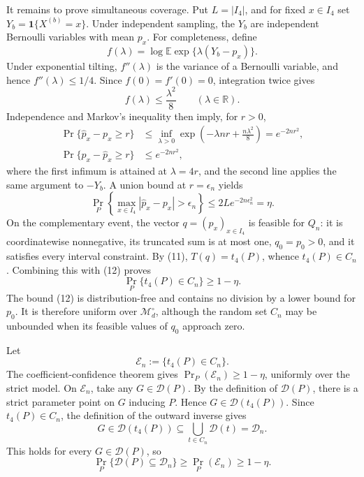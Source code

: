 It remains to prove simultaneous coverage.  Put \(L=|I_4|\), and for fixed \(x\in I_4\) set \(Y_b=\mathbf 1\{X^{(b)}=x\}\).  Under independent sampling, the \(Y_b\) are independent Bernoulli variables with mean \(p_x\).  For completeness, define
\[
 f(\lambda)=\log\mathbb E\exp\{\lambda(Y_b-p_x)\}.
\]
Under exponential tilting, \(f''(\lambda)\) is the variance of a Bernoulli variable, and hence \(f''(\lambda)\le1/4\).  Since \(f(0)=f'(0)=0\), integration twice gives
\[
 f(\lambda)\le\frac{\lambda^2}{8}\qquad(\lambda\in\mathbb R).
\]
Independence and Markov's inequality then imply, for \(r>0\),
\[
\begin{aligned}
 \Pr\{\widehat p_x-p_x\ge r\}
 &\le\inf_{\lambda>0}
   \exp\left(-\lambda nr+\frac{n\lambda^2}{8}\right)
 =e^{-2nr^2},\\
 \Pr\{p_x-\widehat p_x\ge r\}&\le e^{-2nr^2},
\end{aligned}
\]
where the first infimum is attained at \(\lambda=4r\), and the second line applies the same argument to \(-Y_b\).  A union bound at \(r=\epsilon_n\) yields
\[
 \Pr_P\!\left\{
   \max_{x\in I_4}|\widehat p_x-p_x|>\epsilon_n
 \right\}
 \le 2L e^{-2n\epsilon_n^2}=\eta.
\tag{12}
\]
On the complementary event, the vector \(q=(p_x)_{x\in I_4}\) is feasible for \(Q_n\): it is coordinatewise nonnegative, its truncated sum is at most one, \(q_0=p_0>0\), and it satisfies every interval constraint.  By (11), \(T(q)=t_4(P)\), whence \(t_4(P)\in C_n\).  Combining this with (12) proves
\[
 \Pr_P\{t_4(P)\in C_n\}\ge1-\eta.
\]
The bound (12) is distribution-free and contains no division by a lower bound for \(p_0\).  It is therefore uniform over \(\mathcal M_d^\circ\), although the random set \(C_n\) may be unbounded when its feasible values of \(q_0\) approach zero.

Let
\[
 \mathcal E_n:=\{t_4(P)\in C_n\}.
\]
The coefficient-confidence theorem gives \(\Pr_P(\mathcal E_n)\ge1-\eta\), uniformly over the strict model.  On \(\mathcal E_n\), take any \(G\in\mathcal D(P)\).  By the definition of \(\mathcal D(P)\), there is a strict parameter point on \(G\) inducing \(P\).  Hence \(G\in\mathcal D(t_4(P))\).  Since \(t_4(P)\in C_n\), the definition of the outward inverse gives
\[
 G\in\mathcal D(t_4(P))
 \subseteq\bigcup_{t\in C_n}\mathcal D(t)=\mathcal D_n.
\]
This holds for every \(G\in\mathcal D(P)\), so
\[
 \Pr_P\{\mathcal D(P)\subseteq\mathcal D_n\}
 \ge\Pr_P(\mathcal E_n)\ge1-\eta.
\tag{13}
\]

